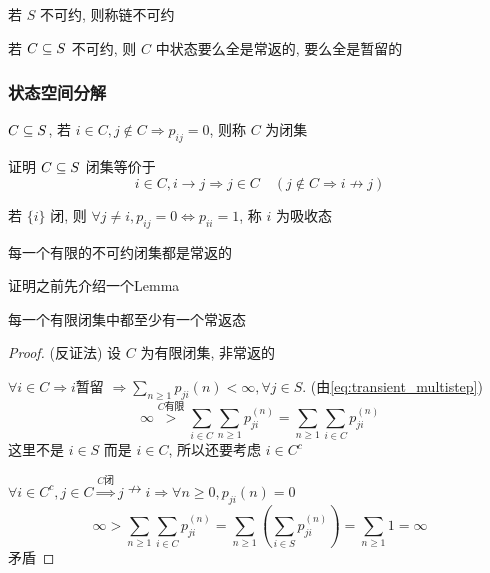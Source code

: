 \begin{definition}[链的不可约]
    若 $S$ 不可约, 则称链不可约
\end{definition}

\begin{theorem}
    若 $C\subseteq S$ 不可约, 则 $C$ 中状态要么全是常返的, 要么全是暂留的
\end{theorem}

\subsubsection{状态空间分解}
\begin{definition}[闭集]
    $C\subseteq S$, 若 $i\in C,j\notin C\Rightarrow p_{ij}=0$, 则称 $C$ 为闭集
\end{definition}

\begin{problem}[作业6-3]
    证明 $C\subseteq S$ 闭集等价于
    \[
    i\in C,i\to j\Rightarrow j\in C\quad (j\notin C\Rightarrow i\nrightarrow j)
    \]
\end{problem}

\begin{example}
    若 $\{i\}$ 闭, 则 $\forall j\neq i,p_{ij}=0\Leftrightarrow p_{ii}=1$, 称 $i$ 为吸收态
\end{example}

\begin{theorem}\label{thm:finite-close-rec}
    每一个有限的不可约闭集都是常返的
\end{theorem}

证明之前先介绍一个Lemma 

\begin{lemma}
    每一个有限闭集中都至少有一个常返态
\end{lemma}
\begin{proof}
(反证法) 设 $C$ 为有限闭集, 非常返的

$\forall i\in C\Rightarrow i$暂留 $\Rightarrow \sum_{n\geq 1}p_{ji}(n)<\infty,\forall j\in S$. (由\eqref{eq:transient_multistep})
\[
\infty\overset{C\text{有限}}{>}\sum_{i\in C}\sum_{n\geq 1}p_{ji}^{(n)}=\sum_{n\geq 1}\sum_{i\in C}p_{ji}^{(n)}
\]
这里不是 $i\in S$ 而是 $i\in C$, 所以还要考虑 $i\in C^c$

$\forall i\in C^c,j\in C\overset{C\text{闭}}{\Rightarrow}j\nrightarrow i \Rightarrow \forall n\geq 0,p_{ji}(n)=0$
\[
\infty>\sum_{n\geq 1}\sum_{i\in C}p_{ji}^{(n)}=\sum_{n\geq 1}\left(\sum_{i\in S}p_{ji}^{(n)}\right)=\sum_{n\geq 1}1=\infty
\]
矛盾
\end{proof}

